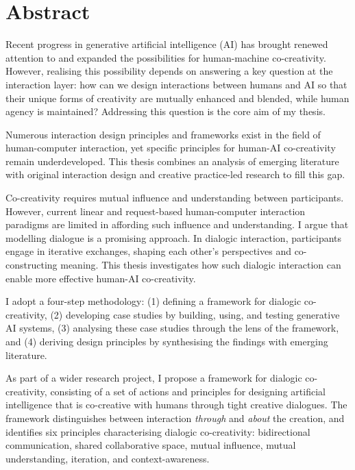 \chapter{Abstract}

Recent progress in generative artificial intelligence (AI) has brought renewed attention to and expanded the possibilities for human-machine co-creativity. However, realising this possibility depends on answering a key question at the interaction layer: how can we design interactions between humans and AI so that their unique forms of creativity are mutually enhanced and blended, while human agency is maintained? Addressing this question is the core aim of my thesis.

Numerous interaction design principles and frameworks exist in the field of human-computer interaction, yet specific principles for human-AI co-creativity remain underdeveloped. This thesis combines an analysis of emerging literature with original interaction design and creative practice-led research to fill this gap.

Co-creativity requires mutual influence and understanding between participants. However, current linear and request-based human-computer interaction paradigms are limited in affording such influence and understanding. I argue that modelling dialogue is a promising approach. In dialogic interaction, participants engage in iterative exchanges, shaping each other's perspectives and co-constructing meaning. This thesis investigates how such dialogic interaction can enable more effective human-AI co-creativity.

I adopt a four-step methodology: (1) defining a framework for dialogic co-creativity, (2) developing case studies by building, using, and testing generative AI systems, (3) analysing these case studies through the lens of the framework, and (4) deriving design principles by synthesising the findings with emerging literature.

As part of a wider research project, I propose a framework for dialogic co-creativity, consisting of a set of actions and principles for designing artificial intelligence that is co-creative with humans through tight creative dialogues. The framework distinguishes between interaction \textit{through} and \textit{about} the creation, and identifies six principles characterising dialogic co-creativity: bidirectional communication, shared collaborative space, mutual influence, mutual understanding, iteration, and context-awareness.


